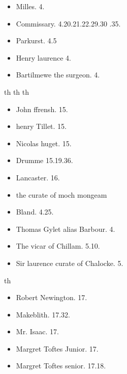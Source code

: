 \documentclass[12pt, a4paper]{book}
\begin{document}
            		
            			\begin{itemize}
            				\item[]Milles. 4.
            				\item[]Commissary. 4.20.21.22.29.30
			.35.
            				\item[]Parkurst. 4.5
            				\item[]Henry laurence 4.
            				\item[]Bartilmewe the surgeon. 4.
				\end{itemize}
            			th
            			th
            			th
            			\begin{itemize}
            				\item[]John ffrensh. 15.
            				\item[]henry Tillet. 15.
            				\item[]Nicolas huget. 15.
            				\item[]Drumme 15.19.36.
            				\item[]Lancaster. 16.
            				\item[]the curate of moch mongeam
            			\end{itemize}
			
			
				\begin{itemize}
					\item[]Bland. 4.25.
					\item[]Thomas Gylet alias Barbour. 4.
					\item[]The vicar of Chillam. 5.10.
					\item[]Sir laurence curate of Chalocke. 5.
				\end{itemize}
				th
				\begin{itemize}
					\item[]Robert Newington. 17.
					\item[]Makeblith. 17.32.
					\item[]Mr. Isaac. 17.
					\item[]Margret Toftes Junior. 17.
					\item[]Margret Toftes senior. 17.18.
				\end{itemize}
			
            		
				
				\marginpar[\vspace{0.5cm}{\textcolor{Gray}{th}}]{}
			
				
				\marginpar[\vspace{0.5cm}{\textcolor{Gray}{th}}]{}
			
\end{document}
